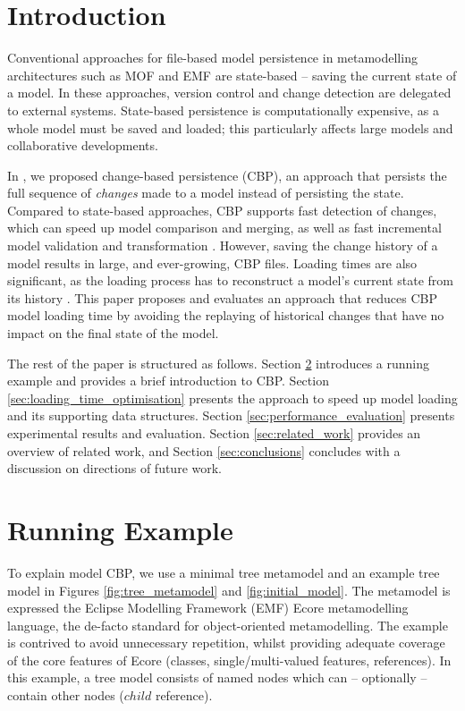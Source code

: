 \documentclass{llncs}
\begin{document}
    \section{Introduction}
    \label{sec:introduction}
    Conventional approaches for file-based model persistence in metamodelling architectures such as MOF \cite{omg2018mof} and EMF \cite{steinberg2008emf} are state-based -- saving the current state of a model.  In these approaches,  version control and change detection are delegated to external systems.  State-based persistence is computationally expensive, as a whole model must be saved and loaded; this particularly affects large models and collaborative developments.
    
    In \cite{yohannis2017turning}, we proposed change-based persistence (CBP), an approach that persists the full sequence of \emph{changes} made to a model instead of persisting the state. Compared to state-based approaches, CBP supports fast detection of changes, which can speed up model comparison and merging, as well as fast incremental model validation and transformation \cite{rath2012derived,ogunyomi2015property}. However, saving the change history of a model results in large, and ever-growing, CBP files.  Loading times are also significant, as the loading process has to reconstruct a model's current state from its history \cite{yohannis2017turning}.   This paper proposes and evaluates an approach that reduces CBP model loading time by avoiding the replaying of historical changes that have no impact on the final state of the model.
    
    The rest of the paper is structured as follows. Section \ref{sec:case_study} introduces a running example and provides a brief introduction to CBP.
    Section \ref{sec:loading_time_optimisation} presents the approach to speed up model loading and its supporting data structures. Section \ref{sec:performance_evaluation} presents experimental results and evaluation. Section \ref{sec:related_work} provides an overview of related work, and Section \ref{sec:conclusions} concludes with a discussion on directions of future work.
    
    \vspace{-15pt}
    \section{Running Example}
    \label{sec:case_study}
    \vspace{-10pt}
    To explain model CBP, we use a minimal tree metamodel and an example tree model in Figures \ref{fig:tree_metamodel} and \ref{fig:initial_model}.
    The metamodel is expressed the Eclipse Modelling Framework (EMF) Ecore metamodelling language, the de-facto standard for object-oriented metamodelling.  The example is contrived to avoid unnecessary repetition, whilst providing adequate coverage of the core features of Ecore (classes, single/multi-valued features, references).
    In this example, a tree model consists of named nodes which can -- optionally -- contain other nodes ($child$ reference).
    
\end{document}

